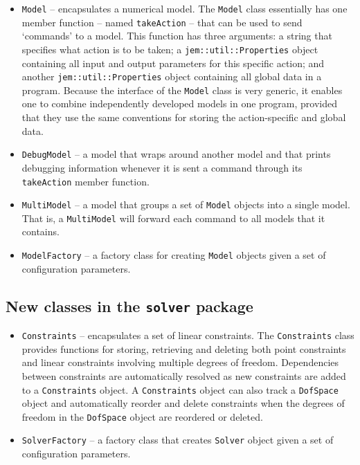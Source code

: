 \documentclass[a4paper,11pt]{article}
\newcommand{\Code}[1]{\texttt{#1}}
\begin{document}
\begin{itemize}

\item \Code{Model} -- encapsulates a numerical model. The \Code{Model}
  class essentially has one member function -- named \Code{takeAction}
  -- that can be used to send `commands' to a model. This function has
  three arguments: a string that specifies what action is to be taken;
  a \Code{jem::\-util::\-Properties} object containing all input and
  output parameters for this specific action; and another
  \Code{jem::\-util::\-Properties} object containing all global data
  in a program. Because the interface of the \Code{Model} class is
  very generic, it enables one to combine independently developed
  models in one program, provided that they use the same conventions
  for storing the action-specific and global data.

\item \Code{DebugModel} -- a model that wraps around another model and
  that prints debugging information whenever it is sent a command
  through its \Code{takeAction} member function.

\item \Code{MultiModel} -- a model that groups a set of \Code{Model}
  objects into a single model. That is, a \Code{MultiModel} will
  forward each command to all models that it contains.

\item \Code{ModelFactory} -- a factory class for creating \Code{Model}
  objects given a set of configuration parameters.

\end{itemize}



\subsection{New classes in the \Code{solver} package}

\begin{itemize}

\item \Code{Constraints} -- encapsulates a set of linear constraints.
  The \Code{Constraints} class provides functions for storing,
  retrieving and deleting both point constraints and linear
  constraints involving multiple degrees of freedom. Dependencies
  between constraints are automatically resolved as new constraints
  are added to a \Code{Constraints} object. A \Code{Constraints}
  object can also track a \Code{DofSpace} object and automatically
  reorder and delete constraints when the degrees of freedom in the
  \Code{DofSpace} object are reordered or deleted.

\item \Code{SolverFactory} -- a factory class that creates
  \Code{Solver} object given a set of configuration parameters.

\end{itemize}
\end{document}
